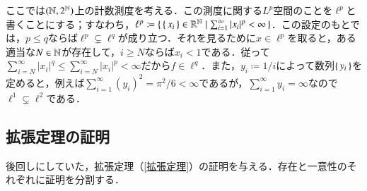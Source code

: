 \begin{exm}
ここでは$(\mathbb{N}, 2^{\mathbb{N}})$上の計数測度を考える．この測度に関する$L^p$空間のことを$\ell^p$と書くことにする；すなわち，$\ell^p \coloneqq \set{ \set{x_i} \in \mathbb{R}^{\mathbb{N}}| \sum_{i=1}^\infty |x_i|^p < \infty }$．この設定のもとでは，$p \leq q$ならば$\ell^p \subsetneq \ell^q$が成り立つ．それを見るために$x \in \ell^p$を取ると，ある適当な$N \in \mathbb{N}$が存在して，$i \geq N$ならば$x_i < 1$である．従って$\sum_{i=N}^\infty |x_i|^q \leq \sum_{i=N}^\infty |x_i|^p < \infty$だから$f \in \ell^q$．また，$y_i \coloneqq 1/i$によって数列$\set{y_i}$を定めると，例えば$\sum_{i=1}^\infty (y_i)^2 = \pi^2/6 < \infty$であるが，$\sum_{i=1}^\infty y_i = \infty$なので$\ell^1 \subsetneq \ell^2$である．
\end{exm}

\subsection{拡張定理の証明}

後回しにしていた，拡張定理（\cref{拡張定理}）の証明を与える．存在と一意性のそれぞれに証明を分割する．

\caratheodory*

